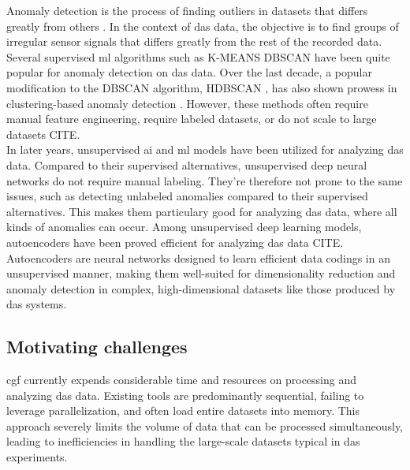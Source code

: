 
Anomaly detection is the process of finding outliers in datasets that differs greatly from others \cite{anomaly}. In the context of \acrshort{das} data, the objective is to find groups of irregular sensor signals that differs greatly from the rest of the recorded data. 
Several supervised \acrfull{ml} algorithms such as K-MEANS \cite{hartigan1979k} DBSCAN \cite{ester1996density} have been quite popular for anomaly detection on \acrshort{das} data. Over the last decade, a popular modification to the DBSCAN algorithm, HDBSCAN \cite{rahman2016hdbscandensitybasedclustering}, has also shown prowess in clustering-based anomaly detection \cite{ariyaluran2022clustering}. However, these methods often require manual feature engineering, require labeled datasets, or do not scale to large datasets CITE.  \\
In later years, unsupervised \acrshort{ai} and \acrshort{ml} models have been utilized for analyzing \acrshort{das} data. Compared to their supervised alternatives, unsupervised deep neural networks do not require manual labeling. They're therefore not prone to the same issues, such as detecting unlabeled anomalies \cite{wei2022lstmautoencoder, srivastava2016unsupervised} compared to their supervised alternatives. This makes them particulary good for analyzing \acrshort{das} data, where all kinds of anomalies can occur. 
Among unsupervised deep learning models, autoencoders have been proved efficient for analyzing \acrshort{das} data CITE. Autoencoders are neural networks designed to learn efficient data codings in an unsupervised manner, making them well-suited for dimensionality reduction and anomaly detection in complex, high-dimensional datasets like those produced by \acrshort{das} systems.

\subsection{Motivating challenges}

\acrshort{cgf} currently expends considerable time and resources on processing and analyzing \acrshort{das} data. Existing tools are predominantly sequential, failing to leverage parallelization, and often load entire datasets into memory. This approach severely limits the volume of data that can be processed simultaneously, leading to inefficiencies in handling the large-scale datasets typical in \acrshort{das} experiments. 

